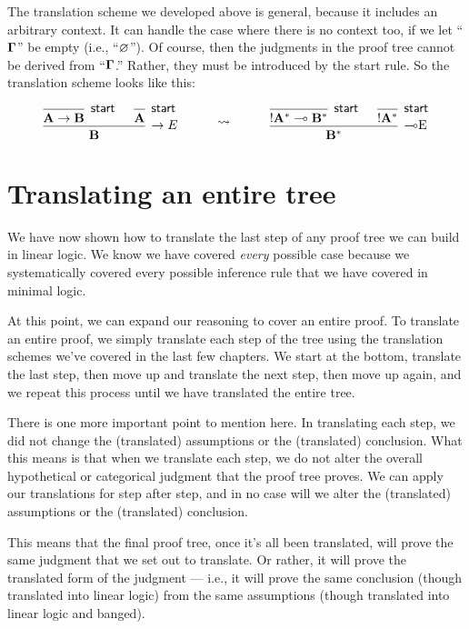 \documentclass[../../../main.tex]{subfiles}
\begin{document}
The translation scheme we developed above is general, because it includes an arbitrary context. It can handle the case where there is no context too, if we let ``$\nd{\context/}$'' be empty (i.e., ``$\emptyassumptions/$''). Of course, then the judgments in the proof tree cannot be derived from ``$\nd{\context/}$.'' Rather, they must be introduced by the start rule. So the translation scheme looks like this:

$$
\begin{prooftree}
  \hypo{}
  \infer1[\startrule/]{\nd{A} \impl/ \nd{B}}
  \hypo{}
  \infer1[\startrule/]{\nd{A}}
  \infer2[\implElim/]{\nd{B}}
\end{prooftree}
\hskip 1cm \rightsquigarrow \hskip 1cm
\begin{prooftree}
  \hypo{}
  \infer1[\startrule/]{\bang/\nd{A}^{*} \lolli/ \nd{B}^{*}}
  \hypo{}
  \infer1[\startrule/]{\bang/\nd{A}^{*}}
  \infer2[\lolliElim/]{\nd{B}^{*}}
\end{prooftree}
$$


\section{Translating an entire tree}

We have now shown how to translate the last step of any proof tree we can build in linear logic. We know we have covered \emph{every} possible case because we systematically covered every possible inference rule that we have covered in minimal logic.

At this point, we can expand our reasoning to cover an entire proof. To translate an entire proof, we simply translate each step of the tree using the translation schemes we've covered in the last few chapters. We start at the bottom, translate the last step, then move up and translate the next step, then move up again, and we repeat this process until we have translated the entire tree.

There is one more important point to mention here. In translating each step, we did not change the (translated) assumptions or the (translated) conclusion. What this means is that when we translate each step, we do not alter the overall hypothetical or categorical judgment that the proof tree proves. We can apply our translations for step after step, and in no case will we alter the (translated) assumptions or the (translated) conclusion.

This means that the final proof tree, once it's all been translated, will prove the same judgment that we set out to translate. Or rather, it will prove the translated form of the judgment --- i.e., it will prove the same conclusion (though translated into linear logic) from the same assumptions (though translated into linear logic and banged).
\end{document}
